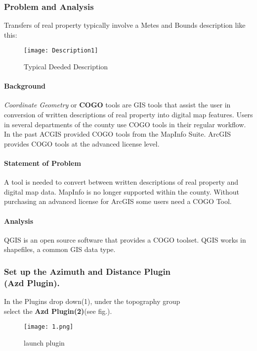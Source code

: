 \subsubsection{Problem and Analysis}
Transfers of real property typically involve a Metes and Bounds description like this:
\begin{figure}[h!]
\centering
    \texttt{[image: Description1]}
\vspace{-.2in}

\caption{Typical Deeded Description}
\end{figure}
\begin{adjmulticols}{2}{\innerMar}{\outerMar}
\paragraph{Background}
\noindent
\textit{Coordinate Geometry} or \textbf{COGO} tools are GIS tools that assist the user in conversion of written descriptions of real property into digital map features.  Users in several departments of the county use COGO tools in their regular workflow.  In the past ACGIS provided COGO tools from the MapInfo Suite.  ArcGIS provides COGO tools at the advanced license level.
\paragraph{Statement of Problem}
\noindent A tool is needed to convert between written descriptions of real property and digital map data.  MapInfo is no longer supported within the county.  Without purchasing an advanced license for ArcGIS some users need a COGO Tool.

\paragraph{Analysis}
\noindent QGIS is an open source software that provides a COGO toolset.  QGIS works in shapefiles, a common GIS data type.
\end{adjmulticols}
\clearpage
\subsubsection[Set up the Azimuth and Distance Plugin]{\Large Set up the Azimuth and Distance Plugin \\\small(Azd Plugin).}
\medskip
\large In the Plugins drop down(1), \large under the topography group\\\Large select the \textbf {Azd Plugin(2)}(see fig.).
\begin{figure}[H] %
\begin{center}
\texttt{[image: 1.png]}
\end{center}
\caption{launch plugin}
\end{figure}
\clearpage

